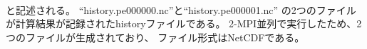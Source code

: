 \\

\noindent と記述される。
``history.pe000000.nc''と``history.pe000001.nc''
の2つのファイルが計算結果が記録されたhistoryファイルである。
2-MPI並列で実行したため、2つのファイルが生成されており、
ファイル形式はNetCDFである。

